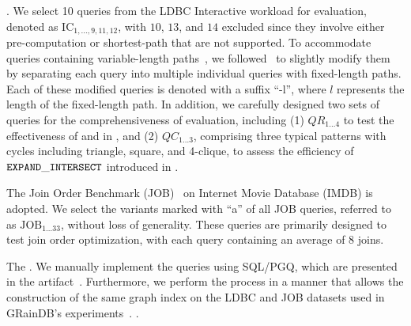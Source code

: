  .
    We select 10 queries from the LDBC Interactive workload for evaluation, denoted as $\text{IC}_{1, \ldots, 9, 11, 12}$, with $10$, $13$, and $14$ excluded since they involve either pre-computation or shortest-path that are not supported.
    To accommodate queries containing variable-length paths~\cite{graindb}, we followed~\cite{graindb} to slightly modify them by separating each query into multiple individual queries with fixed-length paths. Each of these modified queries is denoted with a suffix ``-l'', where $l$ represents the length of the fixed-length path. In addition, we carefully designed two sets of queries for the comprehensiveness of evaluation, including (1) $QR_{1\ldots 4}$ to test the effectiveness of \filterrule and \joinfuserule in \name, and (2) $QC_{1\ldots 3}$, comprising three typical patterns with cycles including triangle, square, and 4-clique, to assess the efficiency of $\texttt{EXPAND}\_\texttt{INTERSECT}$ introduced in .

 The Join Order Benchmark (JOB)~\cite{job_snb} on Internet Movie Database (IMDB) is adopted. We select the variants marked with ``a'' of all JOB queries, referred to as $\text{JOB}_{1\ldots 33}$, without loss of generality. These queries are primarily designed to test join order optimization, with each query containing an average of $8$ joins.

The .
We manually implement the queries using SQL/PGQ, which are presented in the artifact~\cite{artifact}.
Furthermore, we perform the \rgmapping process in a manner that allows the construction of the same graph index on the LDBC and JOB datasets used in GRainDB's experiments~\cite{graindb}.
.


